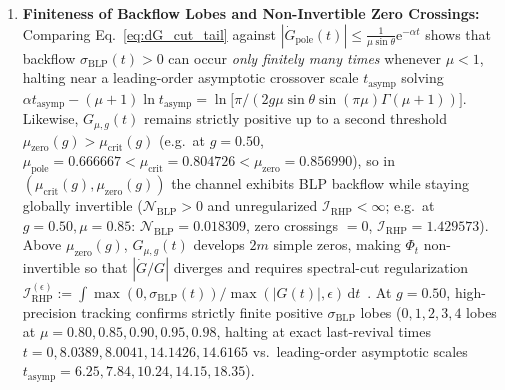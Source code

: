 \documentclass[twocolumn,10pt,amsmath,amssymb,floatfix]{revtex4-2}
\theoremstyle{plain}
\theoremstyle{definition}
\newcommand{\dd}{\mathrm{d}}
\newcommand{\ee}{\mathrm{e}}
\newcommand{\NBLP}{\mathcal{N}_{\mathrm{BLP}}}
\newcommand{\IRHP}{\mathcal{I}_{\mathrm{RHP}}}
\newcommand{\IRHPreg}{\mathcal{I}_{\mathrm{RHP}}^{(\epsilon)}}
\newcommand{\mupole}{\mu_{\mathrm{pole}}}
\newcommand{\mucrit}{\mu_{\mathrm{crit}}}
\newcommand{\muzero}{\mu_{\mathrm{zero}}}
\begin{document}
\begin{enumerate}[leftmargin=1.4em,itemsep=2pt]
\item \textbf{Finiteness of Backflow Lobes and Non-Invertible Zero Crossings:} Comparing Eq.~\eqref{eq:dG_cut_tail} against $|\dot{G}_{\mathrm{pole}}(t)| \le \frac{1}{\mu\sin\theta}\ee^{-\alpha t}$ shows that backflow $\sigma_{\mathrm{BLP}}(t) > 0$ can occur \emph{only finitely many times} whenever $\mu < 1$, halting near a leading-order asymptotic crossover scale $t_{\mathrm{asymp}}$ solving $\alpha t_{\mathrm{asymp}} - (\mu+1)\ln t_{\mathrm{asymp}} = \ln\!\big[\pi/(2g\mu\sin\theta\sin(\pi\mu)\Gamma(\mu+1))\big]$. Likewise, $G_{\mu,g}(t)$ remains strictly positive up to a second threshold $\muzero(g) > \mucrit(g)$ (e.g.\ at $g=0.50$, $\mupole = 0.666667 < \mucrit = 0.804726 < \muzero = 0.856990$), so in $(\mucrit(g), \muzero(g))$ the channel exhibits BLP backflow while staying globally invertible ($\NBLP > 0$ and unregularized $\IRHP < \infty$; e.g.\ at $g=0.50,\mu=0.85$: $\NBLP = 0.018309$, zero crossings $= 0$, $\IRHP = 1.429573$). Above $\muzero(g)$, $G_{\mu,g}(t)$ develops $2m$ simple zeros, making $\Phi_t$ non-invertible so that $|\dot{G}/G|$ diverges and requires spectral-cut regularization $\IRHPreg := \int \max(0, \sigma_{\mathrm{BLP}}(t))/\max(|G(t)|, \epsilon)\,\dd t$~\cite{Rivas2010PRL,Hall2014PRA}. At $g=0.50$, high-precision tracking confirms strictly finite positive $\sigma_{\mathrm{BLP}}$ lobes ($0, 1, 2, 3, 4$ lobes at $\mu = 0.80, 0.85, 0.90, 0.95, 0.98$, halting at exact last-revival times $t = 0, 8.0389, 8.0041, 14.1426, 14.6165$ vs.\ leading-order asymptotic scales $t_{\mathrm{asymp}} = 6.25, 7.84, 10.24, 14.15, 18.35$).
\end{enumerate}
\end{document}
